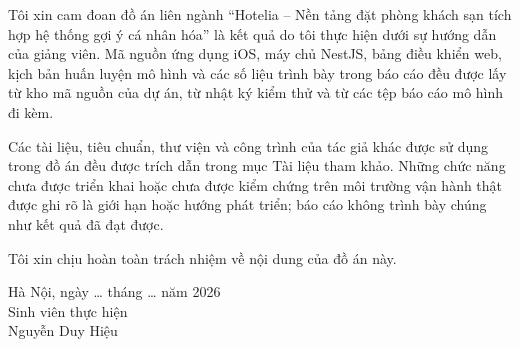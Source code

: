 
Tôi xin cam đoan đồ án liên ngành ``Hotelia -- Nền tảng đặt phòng khách sạn tích hợp hệ thống gợi ý cá nhân hóa'' là kết quả do tôi thực hiện dưới sự hướng dẫn của giảng viên. Mã nguồn ứng dụng iOS, máy chủ NestJS, bảng điều khiển web, kịch bản huấn luyện mô hình và các số liệu trình bày trong báo cáo đều được lấy từ kho mã nguồn của dự án, từ nhật ký kiểm thử và từ các tệp báo cáo mô hình đi kèm.

Các tài liệu, tiêu chuẩn, thư viện và công trình của tác giả khác được sử dụng trong đồ án đều được trích dẫn trong mục Tài liệu tham khảo. Những chức năng chưa được triển khai hoặc chưa được kiểm chứng trên môi trường vận hành thật được ghi rõ là giới hạn hoặc hướng phát triển; báo cáo không trình bày chúng như kết quả đã đạt được.

Tôi xin chịu hoàn toàn trách nhiệm về nội dung của đồ án này.

\vspace{1.2cm}
\begin{flushright}
\begin{minipage}{7.5cm}
\centering
Hà Nội, ngày \ldots{} tháng \ldots{} năm 2026\\
Sinh viên thực hiện\\[2.2cm]
Nguyễn Duy Hiệu
\end{minipage}
\end{flushright}
